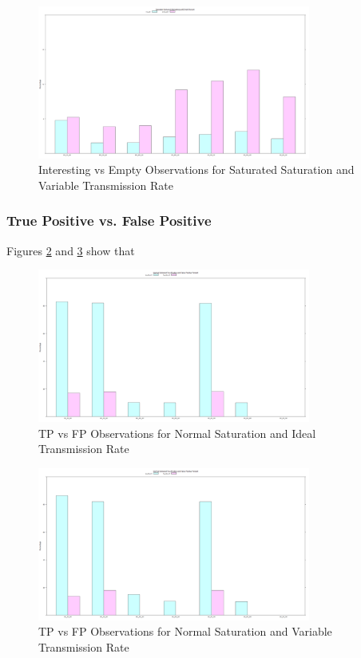 	\begin{figure}[H]
	\centering
	\includegraphics[width=0.8\textwidth]{Chap7/figures/plots/saturated_variable/emptvsint_percent.png}
	\caption{Interesting vs Empty Observations for Saturated Saturation and Variable Transmission Rate}
	\label{fig:sim:res:sat:variable:emptint}
	\end{figure}
\subsubsection{True Positive vs. False Positive}
	Figures \ref{fig:sim:res:norm:ideal:tpfp} and \ref{fig:sim:res:norm:variable:tpfp} show that 
	\begin{figure}[H]
	\centering
	\includegraphics[width=0.8\textwidth]{Chap7/figures/plots/normal_ideal/tpvsfp_percent.png}
	\caption{TP vs FP Observations for Normal Saturation and Ideal Transmission Rate}
	\label{fig:sim:res:norm:ideal:tpfp}
	\end{figure}

	\begin{figure}[H]
	\centering
	\includegraphics[width=0.8\textwidth]{Chap7/figures/plots/normal_variable/tpvsfp_percent.png}
	\caption{TP vs FP Observations for Normal Saturation and Variable Transmission Rate}
	\label{fig:sim:res:norm:variable:tpfp}
	\end{figure}

